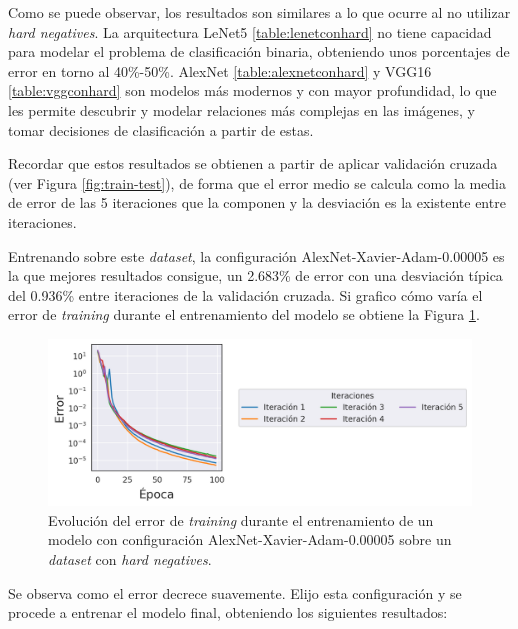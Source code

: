 Como se puede observar, los resultados son similares a lo que ocurre al no utilizar \textit{hard negatives}. La arquitectura LeNet5 \ref{table:lenetconhard} no tiene capacidad para modelar el problema de clasificación binaria, obteniendo unos porcentajes de error en torno al 40\%-50\%. AlexNet \ref{table:alexnetconhard} y VGG16 \ref{table:vggconhard} son modelos más modernos y con mayor profundidad, lo que les permite descubrir y modelar relaciones más complejas en las imágenes, y tomar decisiones de clasificación a partir de estas. 

Recordar que estos resultados se obtienen a partir de aplicar validación cruzada (ver Figura \ref{fig:train-test}), de forma que el error medio se calcula como la media de error de las 5 iteraciones que la componen y la desviación es la existente entre iteraciones.

Entrenando sobre este \textit{dataset}, la configuración AlexNet-Xavier-Adam-0.00005 es la que mejores resultados consigue, un 2.683\% de error con una desviación típica del 0.936\% entre iteraciones de la validación cruzada. Si grafico cómo varía el error de \textit{training} durante el entrenamiento del modelo se obtiene la Figura \ref{fig:synthetic-loss_alexnet_xavier_adam_00005}.

\begin{figure}[H]
\centering
    \includegraphics[scale=0.67]{imagenes/image_classification/synthetic_dataset/loss_alexnet_xavier_adam_00005.png}
    \caption{Evolución del error de \textit{training} durante el entrenamiento de un modelo con configuración AlexNet-Xavier-Adam-0.00005 sobre un \textit{dataset} con \textit{hard negatives}.}
    \label{fig:synthetic-loss_alexnet_xavier_adam_00005}
\end{figure}

Se observa como el error decrece suavemente. Elijo esta configuración y se procede a entrenar el modelo final, obteniendo los siguientes resultados:


